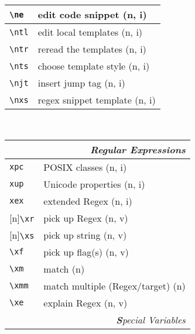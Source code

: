 \documentclass[oneside,10pt,landscape,DIV17]{scrartcl}
\newcommand{\Rep}{{\scriptsize{[n]}}}
\begin{document}
\begin{multicols}{3}
\begin{center}
\begin{tabular}[]{|p{11mm}|p{60mm}|}
\hline \verb'\ne'  & edit code snippet         \hfill (n, i)   \\
%
\hline \verb'\ntl' & edit local templates      \hfill (n, i)\\
\hline \verb'\ntr' & reread the templates      \hfill (n, i)\\
\hline \verb'\nts' & choose template style     \hfill (n, i)\\
%
\hline \verb'\njt' & insert jump tag           \hfill (n, i)\\
\hline \verb'\nxs' & regex snippet template    \hfill (n, i)\\
\hline
\end{tabular}\\
%
%
\begin{tabular}[]{|p{11mm}|p{60mm}|}
\hline
\multicolumn{2}{|r|}{\textsl{Regular E\textbf{x}pressions}}     \\[1.0ex]
\hline     \verb'xpc' &  POSIX classes                 \hfill (n, i)\\ 
\hline     \verb'xup' &  Unicode properties            \hfill (n, i)\\ 
\hline     \verb'xex' &  extended Regex                \hfill (n, i)\\ 
\hline \Rep\verb'\xr' &  pick up Regex                 \hfill (n, v)\\
\hline \Rep\verb'\xs' &  pick up string                \hfill (n, v)\\
\hline     \verb'\xf' &  pick up flag(s)               \hfill (n, v)\\
\hline     \verb'\xm' &  match                         \hfill (n)   \\
\hline     \verb'\xmm'&  match multiple (Regex/target) \hfill (n)   \\
\hline     \verb'\xe' &  explain Regex                 \hfill (n, v)\\
\hline
\hline
\multicolumn{2}{|r|}{\textsl{\textbf{S}pecial Variables}}            \\[1.0ex]

\end{tabular}
\end{center}
\end{multicols}
\end{document}
